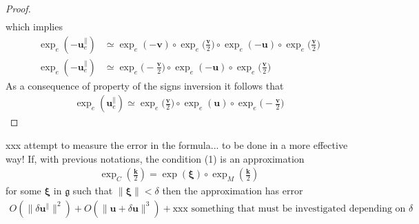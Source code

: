 \begin{proof}
\begin{align*}
	\end{align*}
	which implies
	\begin{align*}
	\exp_{e}(-\mathbf{u}_{e}^{\parallel}) 
	&\simeq
	\exp_{e}(-\mathbf{v}) 
	\circ \exp_{e}\big(\frac{\mathbf{v}}{2}\big)   
	\circ  \exp_{e}(-\mathbf{u}) 
	\circ \exp_{e}\big(\frac{\mathbf{v}}{2}\big)
	\\
	\exp_{e}(-\mathbf{u}_{e}^{\parallel}) 
	&\simeq
	\exp_{e}\big(-\frac{\mathbf{v}}{2}\big)   
	\circ  \exp_{e}(-\mathbf{u}) 
	\circ \exp_{e}\big(\frac{\mathbf{v}}{2}\big)
	\end{align*}
	As a consequence of property of the signs inversion it follows that
	\begin{align*}
	\exp_{e}(\mathbf{u}_{e}^{\parallel}) 
	\simeq
	\exp_{e}\big(\frac{\mathbf{v}}{2}\big)   
	\circ  \exp_{e}(\mathbf{u}) 
	\circ \exp_{e}\big(-\frac{\mathbf{v}}{2}\big)
	\end{align*}
\end{proof} 

\begin{corollary}
	xxx attempt to measure the error in the formula... to be done in a more effective way!
	If, with previous notations, the condition (1) is an approximation
	\begin{align*}
	\exp_{C}(\frac{\mathbf{k}}{2}) = \exp(\mathbf{\xi})\circ \exp_{M}(\frac{\mathbf{k}}{2}) 
	\end{align*}
	for some $ \mathbf{\xi}$ in  $\mathfrak{g}$ such that $\parallel\mathbf{\xi} \parallel < \delta$
	then the approximation has error
	\begin{align*}
	O(\parallel \delta\mathbf{u}^{\parallel} \parallel^{2} )  
	+ O(\parallel \mathbf{u} + \delta\mathbf{u}\parallel^{3})
	+ \text{xxx something that must be investigated depending on } \delta
	\end{align*}
\end{corollary}




